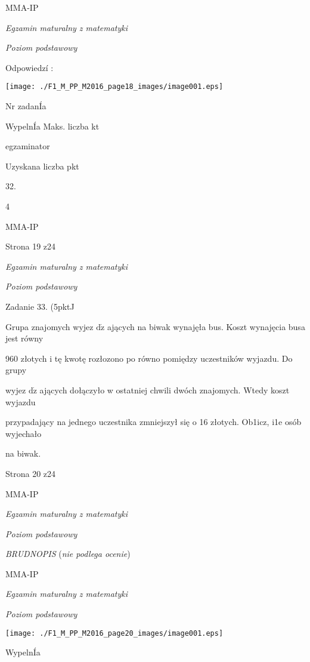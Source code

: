 \documentclass[a4paper,12pt]{article}
\begin{document}
MMA-IP





{\it Egzamin maturalny z matematyki}

{\it Poziom podstawowy}

Odpowiedzí :
\begin{center}
\texttt{[image: ./F1\_M\_PP\_M2016\_page18\_images/image001.eps]}
\end{center}
Nr zadanÍa

WypelnÍa Maks. liczba kt

egzaminator

Uzyskana liczba pkt

32.

4

MMA-IP

Strona 19 z24





{\it Egzamin maturalny z matematyki}

{\it Poziom podstawowy}

Zadanie 33. (5pktJ

Grupa znajomych wyjez $\mathrm{d}\dot{\mathrm{z}}$ ających na biwak wynajęła bus. Koszt wynajęcia busa jest równy

960 złotych i tę kwotę rozłozono po równo pomiędzy uczestników wyjazdu. Do grupy

wyjez $\mathrm{d}\dot{\mathrm{z}}$ ających dołączyło w ostatniej chwili dwóch znajomych. Wtedy koszt wyjazdu

przypadający na jednego uczestnika zmniejszył się o 16 złotych. Ob1icz, i1e osób wyjechało

na biwak.

Strona 20 z24

MMA-IP





{\it Egzamin maturalny z matematyki}

{\it Poziom podstawowy}

{\it BRUDNOPIS} ({\it nie podlega ocenie})

MMA-IP





{\it Egzamin maturalny z matematyki}

{\it Poziom podstawowy}
\begin{center}
\texttt{[image: ./F1\_M\_PP\_M2016\_page20\_images/image001.eps]}
\end{center}
WypelnÍa
\end{document}
